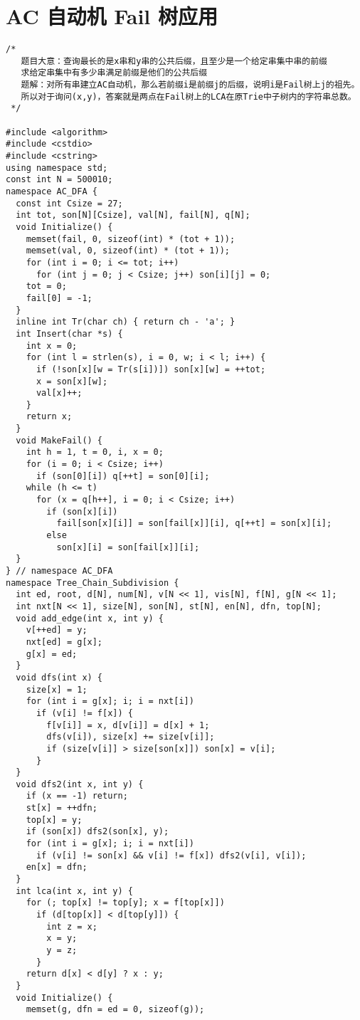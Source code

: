 \section{ AC 自动机 Fail 树应用}
\begin{lstlisting}
/*
   题目大意：查询最长的是x串和y串的公共后缀，且至少是一个给定串集中串的前缀
   求给定串集中有多少串满足前缀是他们的公共后缀
   题解：对所有串建立AC自动机，那么若前缀i是前缀j的后缀，说明i是Fail树上j的祖先。
   所以对于询问(x,y)，答案就是两点在Fail树上的LCA在原Trie中子树内的字符串总数。
 */

#include <algorithm>
#include <cstdio>
#include <cstring>
using namespace std;
const int N = 500010;
namespace AC_DFA {
  const int Csize = 27;
  int tot, son[N][Csize], val[N], fail[N], q[N];
  void Initialize() {
    memset(fail, 0, sizeof(int) * (tot + 1));
    memset(val, 0, sizeof(int) * (tot + 1));
    for (int i = 0; i <= tot; i++)
      for (int j = 0; j < Csize; j++) son[i][j] = 0;
    tot = 0;
    fail[0] = -1;
  }
  inline int Tr(char ch) { return ch - 'a'; }
  int Insert(char *s) {
    int x = 0;
    for (int l = strlen(s), i = 0, w; i < l; i++) {
      if (!son[x][w = Tr(s[i])]) son[x][w] = ++tot;
      x = son[x][w];
      val[x]++;
    }
    return x;
  }
  void MakeFail() {
    int h = 1, t = 0, i, x = 0;
    for (i = 0; i < Csize; i++)
      if (son[0][i]) q[++t] = son[0][i];
    while (h <= t)
      for (x = q[h++], i = 0; i < Csize; i++)
        if (son[x][i])
          fail[son[x][i]] = son[fail[x]][i], q[++t] = son[x][i];
        else
          son[x][i] = son[fail[x]][i];
  }
} // namespace AC_DFA
namespace Tree_Chain_Subdivision {
  int ed, root, d[N], num[N], v[N << 1], vis[N], f[N], g[N << 1];
  int nxt[N << 1], size[N], son[N], st[N], en[N], dfn, top[N];
  void add_edge(int x, int y) {
    v[++ed] = y;
    nxt[ed] = g[x];
    g[x] = ed;
  }
  void dfs(int x) {
    size[x] = 1;
    for (int i = g[x]; i; i = nxt[i])
      if (v[i] != f[x]) {
        f[v[i]] = x, d[v[i]] = d[x] + 1;
        dfs(v[i]), size[x] += size[v[i]];
        if (size[v[i]] > size[son[x]]) son[x] = v[i];
      }
  }
  void dfs2(int x, int y) {
    if (x == -1) return;
    st[x] = ++dfn;
    top[x] = y;
    if (son[x]) dfs2(son[x], y);
    for (int i = g[x]; i; i = nxt[i])
      if (v[i] != son[x] && v[i] != f[x]) dfs2(v[i], v[i]);
    en[x] = dfn;
  }
  int lca(int x, int y) {
    for (; top[x] != top[y]; x = f[top[x]])
      if (d[top[x]] < d[top[y]]) {
        int z = x;
        x = y;
        y = z;
      }
    return d[x] < d[y] ? x : y;
  }
  void Initialize() {
    memset(g, dfn = ed = 0, sizeof(g));

\end{lstlisting}
